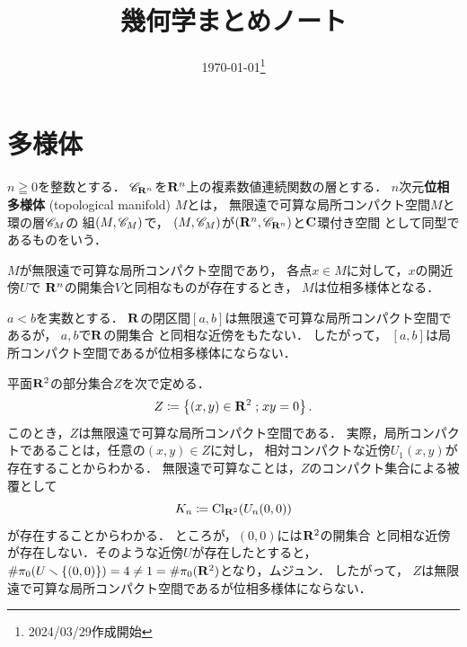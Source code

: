 \newcommand{\smid}{\mathrel{;}}

\newcommand{\Sol}[2][]{\mathop{\mathcal{S}ol}\nolimits_{#1}(#2)}
\newcommand{\Char}{\mathop{\mathrm{Char}}\nolimits}

\newcommand{\dpb}[1][]{\mathbin{\mathop{\times}\limits_{#1}}}
\newcommand{\tpb}[1][]{\mathbin{\mathop{\times}\nolimits_{#1}}}



\title{幾何学まとめノート}
\date{\today\footnote{2024/03/29作成開始}}

\maketitle

\section{多様体}
\begin{leftbar}
\begin{DFN}[{\cite[\S\S 2.9.4]{KS90}}]
  \(n\geqq 0\)を整数とする．
  \(\scC_{\rr^n}\)を\(\rr^n\)上の複素数値連続関数の層とする．
  \(n\)次元\textbf{位相多様体} (topological manifold) \(M\)とは，
  無限遠で可算な局所コンパクト空間\(M\)と環の層\(\scC_M\)の
  組\((M,\scC_M)\)で，
  \((M,\scC_M)\)が\((\rr^n,\scC_{\rr^n})\)と\(\cc\)環付き空間
  として同型であるものをいう．
\end{DFN}
\end{leftbar}
\(M\)が無限遠で可算な局所コンパクト空間であり，
各点\(x\in M\)に対して，\(x\)の開近傍\(U\)で
\(\rr^n\)の開集合\(V\)と同相なものが存在するとき，
\(M\)は位相多様体となる．

\begin{EG}
  \(a<b\)を実数とする．
  \(\rr\)の閉区間\([a,b]\)は無限遠で可算な局所コンパクト空間であるが，
  \(a,b\)で\(\rr\)の開集合
  と同相な近傍をもたない．
  したがって，
  \([a,b]\)は局所コンパクト空間であるが位相多様体にならない．
\end{EG}

\begin{EG}
  平面\(\rr^{2}\)の部分集合\(Z\)を次で定める．
  \[
    Z\coloneqq\left\{(x,y)\in\rr^{2}\smid xy=0\right\}.
  \]
  このとき，\(Z\)は無限遠で可算な局所コンパクト空間である．
  実際，局所コンパクトであることは，任意の\((x,y)\in Z\)に対し，
  相対コンパクトな近傍\(U_{1}(x,y)\)が存在することからわかる．
  無限遠で可算なことは，\(Z\)のコンパクト集合による被覆として
  \[
    K_{n}\coloneqq \Cl[\rr^{2}](U_{n}(0,0))
  \]が存在することからわかる．
  ところが，\((0,0)\)には\(\rr^2\)の開集合
  と同相な近傍が存在しない．そのような近傍\(U\)が存在したとすると，
  \(\#\pi_{0}(U\smi \left\{(0,0)\right\})=4\ne 1=\#\pi_{0}(\rr^2)\)となり，ムジュン．
  したがって，
  \(Z\)は無限遠で可算な局所コンパクト空間であるが位相多様体にならない．
\end{EG}


